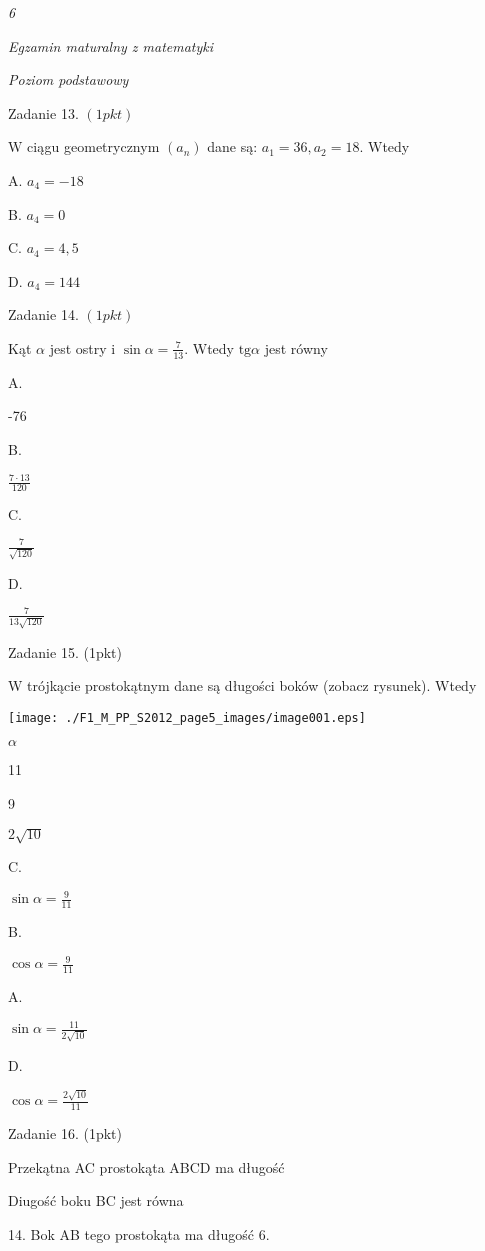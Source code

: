 \documentclass[a4paper,12pt]{article}
\begin{document}
{\it 6}

{\it Egzamin maturalny z matematyki}

{\it Poziom podstawowy}

Zadanie 13. $(1pkt)$

$\mathrm{W}$ ciągu geometrycznym $(a_{n})$ dane są: $a_{1}=36, a_{2}=18$. Wtedy

A. $a_{4}=-18$

B. $a_{4}=0$

C. $a_{4}=4,5$

D. $a_{4}=144$

Zadanie 14. $(1pkt)$

Kąt $\alpha$ jest ostry i $\displaystyle \sin\alpha=\frac{7}{13}$. Wtedy $\mathrm{t}\mathrm{g}\alpha$ jest równy

A.

-76

B.

$\displaystyle \frac{7\cdot 13}{120}$

C.

$\displaystyle \frac{7}{\sqrt{120}}$

D.

$\displaystyle \frac{7}{13\sqrt{120}}$

Zadanie 15. (1pkt)

W trójkącie prostokątnym dane są długości boków (zobacz rysunek). Wtedy
\begin{center}
\texttt{[image: ./F1\_M\_PP\_S2012\_page5\_images/image001.eps]}
\end{center}
$\alpha$

11

9

$2\sqrt{10}$

C.

$\displaystyle \sin\alpha=\frac{9}{11}$

B.

$\displaystyle \cos\alpha=\frac{9}{11}$

A.

$\displaystyle \sin\alpha=\frac{11}{2\sqrt{10}}$

D.

$\displaystyle \cos\alpha=\frac{2\sqrt{10}}{11}$

Zadanie 16. (1pkt)

Przekątna AC prostokąta ABCD ma długość

Diugość boku BC jest równa

14. Bok AB tego prostokąta ma długość 6.
\end{document}
